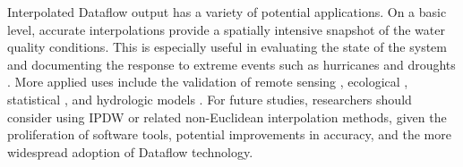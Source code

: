\documentclass[shortnames,nofooter,noheadings]{jss}
\begin{document}
  Interpolated Dataflow output has a variety of potential applications. On a basic level, accurate interpolations provide a spatially intensive snapshot of the water quality conditions. This is especially useful in evaluating the state of the system and documenting the response to extreme events such as hurricanes and droughts \citep{davis2004importance}. More applied uses include the validation of remote sensing \citep{xie2013geographically}, ecological \citep{fourqurean2003forecasting, madden2009florida}, statistical \citep{marshall2011empirical}, and hydrologic models \citep{nuttle2000influence}. For future studies, researchers should consider using IPDW or related non-Euclidean interpolation methods, given the proliferation of software tools, potential improvements in accuracy, and the more widespread adoption of Dataflow technology.



\end{document}
